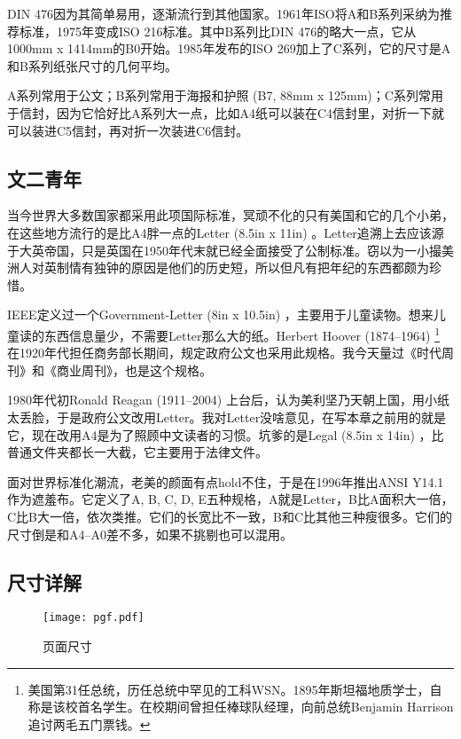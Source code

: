 DIN 476因为其简单易用，逐渐流行到其他国家。1961年ISO将A和B系列采纳为推荐标准，1975年变成ISO 216标准。其中B系列比DIN 476的略大一点，它从1000mm x 1414mm的B0开始。1985年发布的ISO 269加上了C系列，它的尺寸是A和B系列纸张尺寸的几何平均。

A系列常用于公文；B系列常用于海报和护照 (B7, 88mm x 125mm)；C系列常用于信封，因为它恰好比A系列大一点，比如A4纸可以装在C4信封里，对折一下就可以装进C5信封，再对折一次装进C6信封。

\subsection{文二青年}

当今世界大多数国家都采用此项国际标准，冥顽不化的只有美国和它的几个小弟，在这些地方流行的是比A4胖一点的Letter (8.5in x 11in) 。Letter追溯上去应该源于大英帝国，只是英国在1950年代末就已经全面接受了公制标准。窃以为一小撮美洲人对英制情有独钟的原因是他们的历史短，所以但凡有把年纪的东西都颇为珍惜。

IEEE\indexIEEE{}定义过一个Government-Letter (8in x 10.5in) ，主要用于儿童读物。想来儿童读的东西信息量少，不需要Letter那么大的纸。Herbert Hoover (1874--1964)\indexHoover{} \footnote{美国第31任总统，历任总统中罕见的工科WSN。1895年斯坦福地质学士，自称是该校首名学生。在校期间曾担任棒球队经理，向前总统Benjamin Harrison追讨两毛五门票钱。} 在1920年代担任商务部长期间，规定政府公文也采用此规格。我今天量过《时代周刊》和《商业周刊》，也是这个规格。

1980年代初Ronald Reagan (1911--2004)\indexReagon{} 上台后，认为美利坚乃天朝上国，用小纸太丢脸，于是政府公文改用Letter。我对Letter没啥意见，在写本章之前用的就是它，现在改用A4是为了照顾中文读者的习惯。坑爹的是Legal (8.5in x 14in) ，比普通文件夹都长一大截，它主要用于法律文件。

面对世界标准化潮流，老美的颜面有点hold不住，于是在1996年推出ANSI Y14.1作为遮羞布。它定义了A, B, C, D, E五种规格，A就是Letter，B比A面积大一倍，C比B大一倍，依次类推。它们的长宽比不一致，B和C比其他三种瘦很多。它们的尺寸倒是和A4--A0差不多，如果不挑剔也可以混用。

\subsection{尺寸详解}

\begin{figure}[!htbp]
\centering
\texttt{[image: pgf.pdf]}
\caption{页面尺寸}
\label{fig:pagelayout}
\end{figure}

